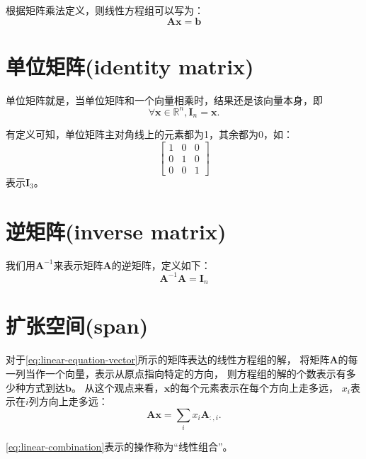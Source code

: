 根据矩阵乘法定义，则线性方程组可以写为：
\begin{equation}
  \label{eq:linear-equation-vector}
  \bm{Ax} = \bm{b}
\end{equation}








\section{单位矩阵(identity matrix)}

单位矩阵就是，当单位矩阵和一个向量相乘时，结果还是该向量本身，即
\begin{equation}
  \forall \bm{x} \in \mathbb{R}^n, \bm{I}_n = \bm{x}.
\end{equation}

有定义可知，单位矩阵主对角线上的元素都为1，其余都为0，如：
\begin{equation}
  \begin{bmatrix}
    1 & 0 & 0 \\
    0 & 1 & 0 \\
    0 & 0 & 1
  \end{bmatrix}
\end{equation}
表示$\bm{I}_3$。

\section{逆矩阵(inverse matrix)}

我们用$\bm{A}^{-1}$来表示矩阵$\bm{A}$的逆矩阵，定义如下：
\begin{equation}
  \bm{A}^{-1}\bm{A} = \bm{I}_n
\end{equation}


\section{扩张空间(span)}
对于\eqref{eq:linear-equation-vector}所示的矩阵表达的线性方程组的解，
将矩阵$\bm{A}$的每一列当作一个向量，表示从原点指向特定的方向，
则方程组的解的个数表示有多少种方式到达$\bm{b}$。
从这个观点来看，$\bm{x}$的每个元素表示在每个方向上走多远，
$x_i$表示在$i$列方向上走多远：
\begin{equation}
  \label{eq:linear-combination}
  \bm{Ax} = \sum_i x_i \bm{A}_{:,i}.
\end{equation}

\eqref{eq:linear-combination}表示的操作称为“线性组合”。

